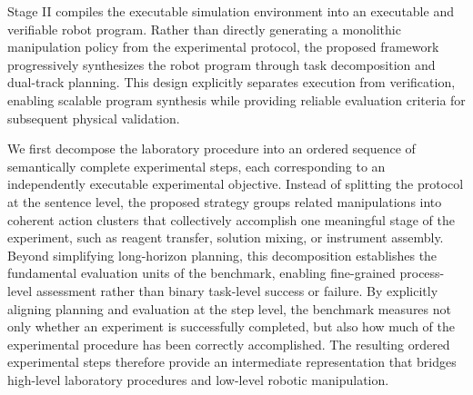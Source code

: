 \documentclass[sigconf]{acmart}
\begin{document}
Stage II compiles the executable simulation environment into an executable and verifiable robot program. Rather than directly generating a monolithic manipulation policy from the experimental protocol, the proposed framework progressively synthesizes the robot program through task decomposition and dual-track planning. This design explicitly separates execution from verification, enabling scalable program synthesis while providing reliable evaluation criteria for subsequent physical validation.

We first decompose the laboratory procedure into an ordered sequence of semantically complete experimental steps, each corresponding to an independently executable experimental objective. Instead of splitting the protocol at the sentence level, the proposed strategy groups related manipulations into coherent action clusters that collectively accomplish one meaningful stage of the experiment, such as reagent transfer, solution mixing, or instrument assembly. Beyond simplifying long-horizon planning, this decomposition establishes the fundamental evaluation units of the benchmark, enabling fine-grained process-level assessment rather than binary task-level success or failure. By explicitly aligning planning and evaluation at the step level, the benchmark measures not only whether an experiment is successfully completed, but also how much of the experimental procedure has been correctly accomplished. The resulting ordered experimental steps therefore provide an intermediate representation that bridges high-level laboratory procedures and low-level robotic manipulation.
\end{document}
